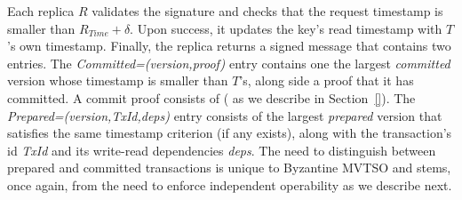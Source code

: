 Each replica $R$ validates the signature  and checks that the request timestamp is smaller than $R_{Time} + \delta$. Upon success, it updates the key's read timestamp with $T$'s own timestamp. Finally, the replica returns a signed message  that contains two entries.
The \textit{Committed=(version,proof)} entry contains one the largest \textit{committed} version whose timestamp is smaller than $T$'s, along side a proof that it has committed. A commit proof consists of  ( as we describe in Section~\ref{}). The \textit{Prepared=(version,TxId,deps)} entry consists of the largest \textit{prepared}  version that satisfies the same timestamp criterion (if any exists), along with the transaction's id \textit{TxId} and its write-read dependencies \textit{deps}.
The need to distinguish between prepared and committed transactions is unique to Byzantine MVTSO and stems, once again, from the need to enforce independent operability as we describe next.


